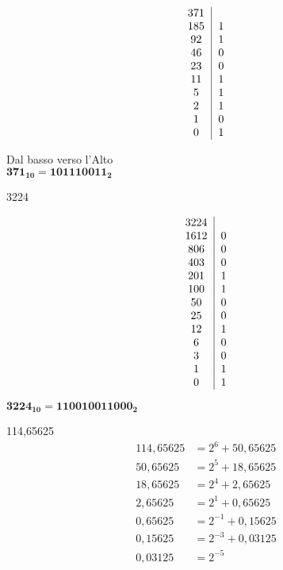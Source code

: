 \documentclass[a4paper, 12pt]{article} %
\begin{document}
\noindent\begin{minipage}{.25\linewidth}
\begin{equation*}
\begin{tabular}{c|c}
371 & \\
185 & 1 \\
92 & 1 \\
46 & 0 \\
23 & 0 \\
11 & 1 \\
5 & 1 \\
2 & 1 \\
1 & 0 \\
0 & 1
\end{tabular}
\end{equation*}
\end{minipage}
\begin{minipage}{.25\linewidth}
\textrm{\color{red}\textuparrow \hspace{0.2cm}Dal basso verso l'Alto} \\
$ \mathbf{371_{10} = 101110011_2}$ \\
\end{minipage}
\quad

\textrm{\color{red} 3224} \\
\noindent\begin{minipage}{.25\linewidth}
\begin{equation*}
	\begin{tabular}{c|c}
		3224 & \\
		1612 & 0 \\
		806 & 0 \\
		403 & 0 \\
		201 & 1 \\
		100 & 1 \\
		50 & 0 \\
		25 & 0 \\
		12 & 1 \\
		6 & 0 \\
		3 & 0 \\
		1 & 1 \\
		0 & 1
	\end{tabular}
\end{equation*}
\end{minipage}
\begin{minipage}{.25\linewidth}
$ \mathbf{3224_{10} = 110010011000_2} $ \\
\end{minipage}
\quad

\pagebreak
\textrm{\color{red} 114,65625} \\
\begin{align*}
	114,65625 &= 2^6 + 50,65625 \\
	50,65625 &= 2^5 + 18,65625 \\
	18,65625 &= 2^4 + 2,65625 \\
	2,65625 &= 2^1 + 0,65625 \\
	0,65625 &= 2^{-1} + 0,15625 \\
	0,15625 &= 2^{-3} + 0,03125 \\
	0,03125 &= 2^{-5} \\
\end{align*}
\end{document}
